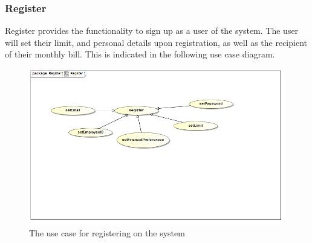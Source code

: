 \documentclass[a4paper,12pt]{report}
\begin{document}
\subsubsection{Register }
Register provides the functionality to sign up as a user of the system. The user will set their limit, and personal details upon registration, as well as the recipient of their monthly bill. This is indicated in the following use case diagram.
\begin{figure}[H]
  \centering
    \includegraphics[width=1.0\textwidth]{../Diagrams/Register/registerUseCase.png}
    \caption{The use case for registering on the system} 
\end{figure}
\end{document}

